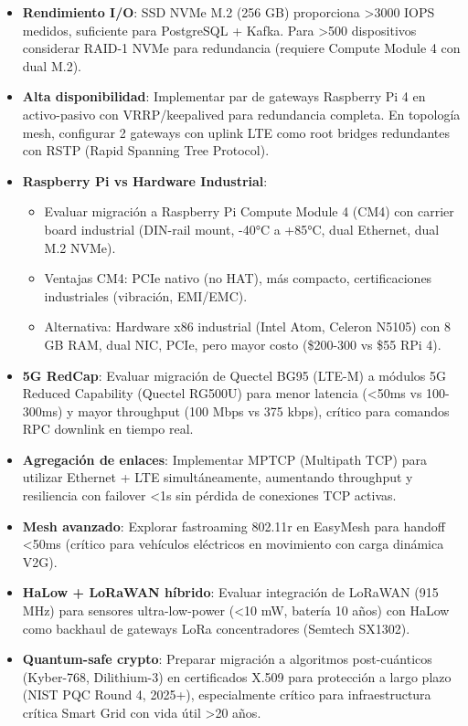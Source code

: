 \begin{itemize}
    \item \textbf{Rendimiento I/O}: SSD NVMe M.2 (256 GB) proporciona >3000 IOPS medidos, suficiente para PostgreSQL + Kafka. Para >500 dispositivos considerar RAID-1 NVMe para redundancia (requiere Compute Module 4 con dual M.2).
    
    \item \textbf{Alta disponibilidad}: Implementar par de gateways Raspberry Pi 4 en activo-pasivo con VRRP/keepalived para redundancia completa. En topología mesh, configurar 2 gateways con uplink LTE como root bridges redundantes con RSTP (Rapid Spanning Tree Protocol).
    
    \item \textbf{Raspberry Pi vs Hardware Industrial}:
    \begin{itemize}
        \item Evaluar migración a Raspberry Pi Compute Module 4 (CM4) con carrier board industrial (DIN-rail mount, -40°C a +85°C, dual Ethernet, dual M.2 NVMe).
        \item Ventajas CM4: PCIe nativo (no HAT), más compacto, certificaciones industriales (vibración, EMI/EMC).
        \item Alternativa: Hardware x86 industrial (Intel Atom, Celeron N5105) con 8 GB RAM, dual NIC, PCIe, pero mayor costo (\$200-300 vs \$55 RPi 4).
    \end{itemize}
    
    \item \textbf{5G RedCap}: Evaluar migración de Quectel BG95 (LTE-M) a módulos 5G Reduced Capability (Quectel RG500U) para menor latencia (<50ms vs 100-300ms) y mayor throughput (100 Mbps vs 375 kbps), crítico para comandos RPC downlink en tiempo real.
    
    \item \textbf{Agregación de enlaces}: Implementar MPTCP (Multipath TCP) para utilizar Ethernet + LTE simultáneamente, aumentando throughput y resiliencia con failover <1s sin pérdida de conexiones TCP activas.
    
    \item \textbf{Mesh avanzado}: Explorar fastroaming 802.11r en EasyMesh para handoff <50ms (crítico para vehículos eléctricos en movimiento con carga dinámica V2G).
    
    \item \textbf{HaLow + LoRaWAN híbrido}: Evaluar integración de LoRaWAN (915 MHz) para sensores ultra-low-power (<10 mW, batería 10 años) con HaLow como backhaul de gateways LoRa concentradores (Semtech SX1302).
    
    \item \textbf{Quantum-safe crypto}: Preparar migración a algoritmos post-cuánticos (Kyber-768, Dilithium-3) en certificados X.509 para protección a largo plazo (NIST PQC Round 4, 2025+), especialmente crítico para infraestructura crítica Smart Grid con vida útil >20 años.
\end{itemize}

